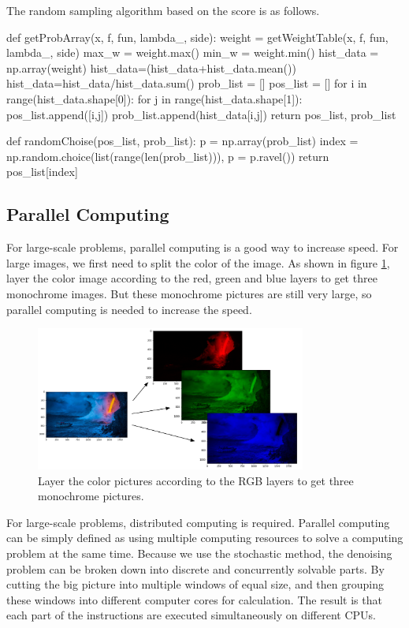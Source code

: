 \documentclass{article}
\begin{document}
The random sampling algorithm based on the score is as follows.
\begin{python}
def getProbArray(x, f, fun, lambda_, side):
    weight = getWeightTable(x, f, fun, lambda_, side)
    max_w = weight.max()
    min_w = weight.min()
    hist_data = np.array(weight)
    hist_data=(hist_data+hist_data.mean())
    hist_data=hist_data/hist_data.sum()
    prob_list = []
    pos_list = []
    for i in range(hist_data.shape[0]):
        for j in range(hist_data.shape[1]):
            pos_list.append([i,j])
            prob_list.append(hist_data[i,j])
    return pos_list, prob_list
  
  def randomChoise(pos_list, prob_list):
    p = np.array(prob_list)
    index = np.random.choice(list(range(len(prob_list))), p = p.ravel())
    return pos_list[index]
\end{python}

\subsection{Parallel Computing}
For large-scale problems, parallel computing is a good way to increase speed. For large images, we first need to split the color of the image. As shown in figure \ref{img23}, layer the color image according to the red, green and blue layers to get three monochrome images. But these monochrome pictures are still very large, so parallel computing is needed to increase the speed.
\begin{figure}[h]
  \includegraphics[width=3.5in]{pic23.png}
  \centering
  \caption{Layer the color pictures according to the RGB layers to get three monochrome pictures.}
  \label{img23}
\end{figure}
For large-scale problems, distributed computing is required. Parallel computing can be simply defined as using multiple computing resources to solve a computing problem at the same time. Because we use the stochastic method, the denoising problem can be broken down into discrete and concurrently solvable parts. By cutting the big picture into multiple windows of equal size, and then grouping these windows into different computer cores for calculation. The result is that each part of the instructions are executed simultaneously on different CPUs.
\end{document}

